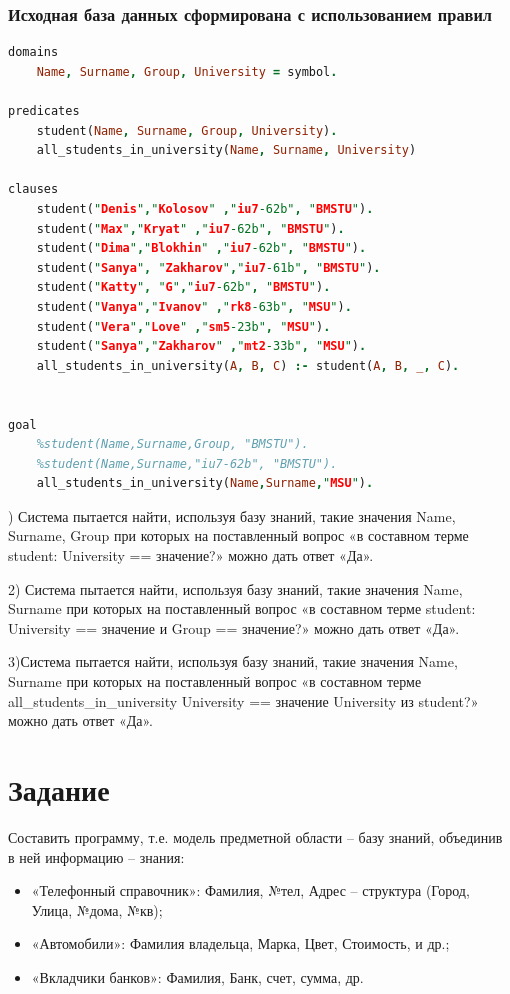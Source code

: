 \documentclass[12pt,a4paper]{article}
\begin{document}
\subsubsection{Исходная база данных сформирована с использованием правил}
\begin{lstlisting}[language=Prolog]
domains 
    Name, Surname, Group, University = symbol. 

predicates 
    student(Name, Surname, Group, University).
    all_students_in_university(Name, Surname, University) 

clauses 
    student("Denis","Kolosov" ,"iu7-62b", "BMSTU"). 
    student("Max","Kryat" ,"iu7-62b", "BMSTU"). 
    student("Dima","Blokhin" ,"iu7-62b", "BMSTU"). 
    student("Sanya", "Zakharov","iu7-61b", "BMSTU"). 
    student("Katty", "G","iu7-62b", "BMSTU"). 
    student("Vanya","Ivanov" ,"rk8-63b", "MSU"). 
    student("Vera","Love" ,"sm5-23b", "MSU"). 
    student("Sanya","Zakharov" ,"mt2-33b", "MSU"). 
    all_students_in_university(A, B, C) :- student(A, B, _, C). 


goal 
    %student(Name,Surname,Group, "BMSTU"). 
    %student(Name,Surname,"iu7-62b", "BMSTU"). 
    all_students_in_university(Name,Surname,"MSU").
\end{lstlisting}
) Система пытается найти, используя базу знаний, такие значения Name, Surname, Group при которых на поставленный вопрос «в составном терме student: University == значение?» можно дать ответ «Да».

2) Система пытается найти, используя базу знаний, такие значения Name, Surname при которых на поставленный вопрос «в составном терме student: University == значение и Group == значение?» можно дать ответ «Да».

3)Система пытается найти, используя базу знаний, такие значения Name, Surname при которых на поставленный вопрос «в составном терме all\_students\_in\_university University == значение University из student?» можно дать ответ «Да».

\section{Задание}

\quad Составить программу, т.е. модель предметной области – базу знаний, объединив в ней информацию – знания:
\begin{itemize}
	\item «Телефонный справочник»: Фамилия, №тел, Адрес – структура (Город, Улица, №дома, №кв);
	\item «Автомобили»: Фамилия владельца, Марка, Цвет, Стоимость, и др.;
	\item «Вкладчики банков»: Фамилия, Банк, счет, сумма, др.
\end{itemize}
\end{document}
